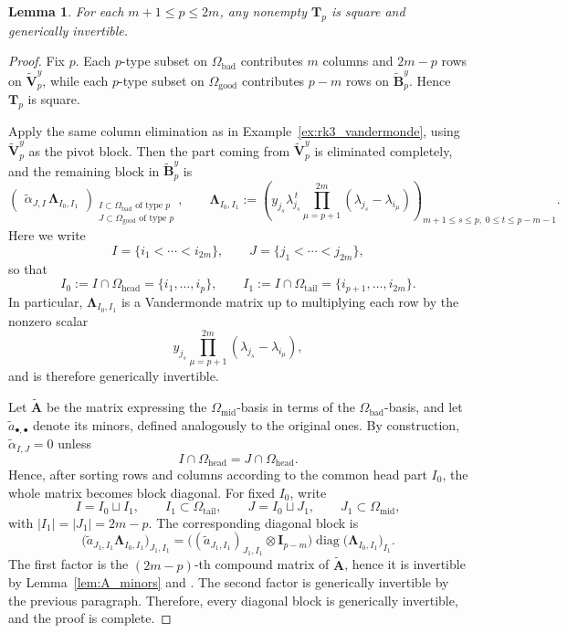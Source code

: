 \documentclass[12pt, letterpaper]{amsart}
\newtheorem{lemma}[theorem]{Lemma}
\theoremstyle{definition}
\newcommand{\bA}{\mathbf{A} }
\newcommand{\bB}{\mathbf{B} }
\newcommand{\bI}{\mathbf{I} }
\newcommand{\bT}{\mathbf{T} }
\newcommand{\bV}{\mathbf{V} }
\newcommand{\Om}{\Omega}
\newcommand{\lbd}{\lambda}
\begin{document}
\begin{lemma}\label{lem:BpVp-invertible}
For each \(m+1\le p\le 2m\), any nonempty \(\bT_p\) is square and generically invertible.
\end{lemma}

\begin{proof}
Fix \(p\). Each \(p\)-type subset on \(\Om_{\mathrm{bad}}\) contributes \(m\) columns and \(2m-p\) rows on \(\widetilde{\bV}_{p}^{y}\), while each \(p\)-type subset on \(\Om_{\mathrm{good}}\) contributes \(p-m\) rows on \(\widetilde{\bB}_{p}^{y}\). Hence \(\bT_p\) is square.

Apply the same column elimination as in Example~\ref{ex:rk3_vandermonde}, using \(\widetilde{\bV}_{p}^{y}\) as the pivot block. Then the part coming from \(\widetilde{\bV}_{p}^{y}\) is eliminated completely, and the remaining block in \(\widetilde{\bB}_{p}^{y}\) is
\[
\begin{pmatrix} \widetilde{\alpha}_{J,I}\,\mathbf\Lambda_{I_0,I_1} \end{pmatrix}_{\substack{I\subset\Om_{\mathrm{bad}}\text{ of type }p\\J\subset\Om_{\mathrm{good}}\text{ of type }p}},\qquad\mathbf\Lambda_{I_0,I_1}:=\left(y_{j_s}\lbd_{j_s}^{\,t}\prod_{\mu=p+1}^{2m}(\lbd_{j_s}-\lbd_{i_\mu})\right)_{m+1\le s\le p,\;0\le t\le p-m-1}.
\]
Here we write
\[I=\{i_1<\cdots<i_{2m}\},\qquad J=\{j_1<\cdots<j_{2m}\},\]
so that
\[I_0:=I\cap\Om_{\mathrm{head}}=\{i_1,\dots,i_p\},\qquad I_1:=I\cap\Om_{\mathrm{tail}}=\{i_{p+1},\dots,i_{2m}\}.\]
In particular, \(\mathbf\Lambda_{I_0,I_1}\) is a Vandermonde matrix up to multiplying each row by the nonzero scalar
\[y_{j_s}\prod_{\mu=p+1}^{2m}(\lambda_{j_s}-\lambda_{i_\mu}),\]
and is therefore generically invertible.

Let \(\widetilde{\bA}\) be the matrix expressing the \(\Om_{\mathrm{mid}}\)-basis in terms of the \(\Om_{\mathrm{bad}}\)-basis, and let \(\widetilde a_{\bullet,\bullet}\) denote its minors, defined analogously to the original ones. By construction, \(\widetilde{\alpha}_{I,J}=0\) unless
\[I\cap\Om_{\mathrm{head}}=J\cap\Om_{\mathrm{head}}.\]
Hence, after sorting rows and columns according to the common head part \(I_0\), the whole matrix becomes block diagonal. For fixed \(I_0\), write
\[I=I_0\sqcup I_1,\qquad I_1\subset\Om_{\mathrm{tail}},\qquad J=I_0\sqcup J_1,\qquad J_1\subset\Om_{\mathrm{mid}},\]
with \(|I_1|=|J_1|=2m-p\). The corresponding diagonal block is
\[
\bigl(\widetilde{a}_{J_1,I_1}\mathbf\Lambda_{I_0,I_1}\bigr)_{J_1,I_1}=\bigl((\widetilde{a}_{J_1,I_1})_{J_1,I_1}\otimes \bI_{p-m}\bigr)\operatorname{diag}\bigl(\mathbf\Lambda_{I_0,I_1}\bigr)_{I_1}.
\]
The first factor is the \((2m-p)\)-th compound matrix of \(\widetilde{\bA}\), hence it is invertible by Lemma~\ref{lem:A_minors} and \cite[\S0.8.1]{HJ13}. The second factor is generically invertible by the previous paragraph. Therefore, every diagonal block is generically invertible, and the proof is complete.
\end{proof}
\end{document}
